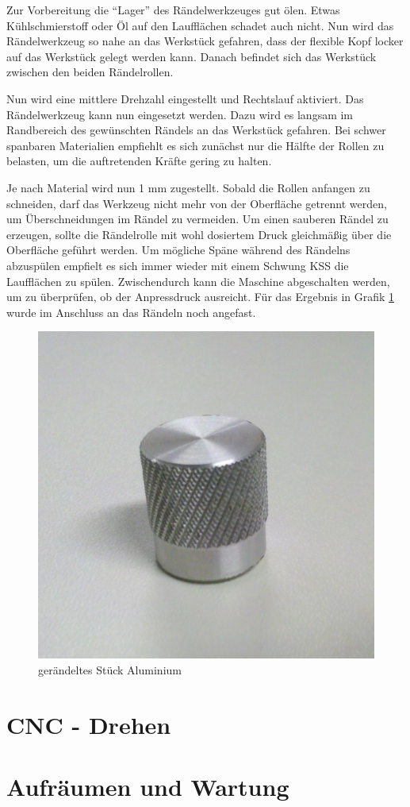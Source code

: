 \documentclass{\basedir/fablab-document}
\begin{document}
Zur Vorbereitung die \enquote{Lager} des Rändelwerkzeuges gut ölen.
Etwas Kühlschmierstoff oder Öl auf den Laufflächen schadet auch nicht. 
Nun wird das Rändelwerkzeug so nahe an das Werkstück gefahren, dass der flexible Kopf locker auf das Werkstück gelegt werden kann.
Danach befindet sich das Werkstück zwischen den beiden Rändelrollen.

Nun wird eine mittlere Drehzahl eingestellt und Rechtslauf aktiviert. 
Das Rändelwerkzeug kann nun eingesetzt werden.
Dazu wird es langsam im Randbereich des gewünschten Rändels an das Werkstück gefahren. 
Bei schwer spanbaren Materialien empfiehlt es sich zunächst nur die Hälfte der Rollen zu belasten, um die auftretenden Kräfte gering zu halten.

Je nach Material wird nun 1 mm zugestellt. Sobald die Rollen anfangen zu schneiden, darf das Werkzeug nicht mehr von der Oberfläche getrennt werden, um Überschneidungen im Rändel zu vermeiden.
Um einen sauberen Rändel zu erzeugen, sollte die Rändelrolle mit wohl dosiertem Druck gleichmäßig über die Oberfläche geführt werden. Um mögliche Späne während des Rändelns abzuspülen empfielt es sich immer wieder mit einem Schwung KSS die Laufflächen zu spülen.
Zwischendurch kann die Maschine abgeschalten werden, um zu überprüfen, ob der Anpressdruck ausreicht.
Für das Ergebnis in Grafik \ref{fig:raendel} wurde im Anschluss an das Rändeln noch angefast.

\begin{figure}[hb]
\caption{gerändeltes Stück Aluminium}
\label{fig:raendel}
\centering
\includegraphics[width=.5\linewidth]{img/raendel}
\end{figure}
\newpage
\section{CNC - Drehen}

\newpage
\section{Aufräumen und Wartung}
\end{document}
